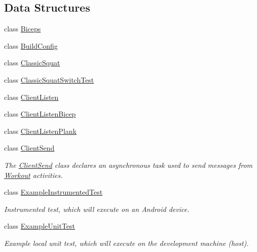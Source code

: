 \subsection*{Data Structures}
\begin{DoxyCompactItemize}
\item 
class \mbox{\hyperlink{classcom_1_1example_1_1trainawearapplication_1_1_biceps}{Biceps}}
\item 
class \mbox{\hyperlink{classcom_1_1example_1_1trainawearapplication_1_1_build_config}{Build\+Config}}
\item 
class \mbox{\hyperlink{classcom_1_1example_1_1trainawearapplication_1_1_classic_squat}{Classic\+Squat}}
\item 
class \mbox{\hyperlink{classcom_1_1example_1_1trainawearapplication_1_1_classic_squat_switch_test}{Classic\+Squat\+Switch\+Test}}
\item 
class \mbox{\hyperlink{classcom_1_1example_1_1trainawearapplication_1_1_client_listen}{Client\+Listen}}
\item 
class \mbox{\hyperlink{classcom_1_1example_1_1trainawearapplication_1_1_client_listen_bicep}{Client\+Listen\+Bicep}}
\item 
class \mbox{\hyperlink{classcom_1_1example_1_1trainawearapplication_1_1_client_listen_plank}{Client\+Listen\+Plank}}
\item 
class \mbox{\hyperlink{classcom_1_1example_1_1trainawearapplication_1_1_client_send}{Client\+Send}}
\begin{DoxyCompactList}\small\item\em The \mbox{\hyperlink{classcom_1_1example_1_1trainawearapplication_1_1_client_send}{Client\+Send}} class declares an asynchronous task used to send messages from \mbox{\hyperlink{classcom_1_1example_1_1trainawearapplication_1_1_workout}{Workout}} activities. \end{DoxyCompactList}\item 
class \mbox{\hyperlink{classcom_1_1example_1_1trainawearapplication_1_1_example_instrumented_test}{Example\+Instrumented\+Test}}
\begin{DoxyCompactList}\small\item\em Instrumented test, which will execute on an Android device. \end{DoxyCompactList}\item 
class \mbox{\hyperlink{classcom_1_1example_1_1trainawearapplication_1_1_example_unit_test}{Example\+Unit\+Test}}
\begin{DoxyCompactList}\small\item\em Example local unit test, which will execute on the development machine (host). \end{DoxyCompactList}\item 

\end{DoxyCompactItemize}
